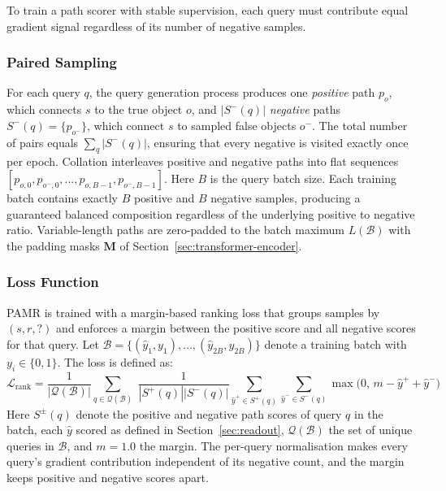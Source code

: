 \documentclass[runningheads]{llncs}
\begin{document}
\label{sec:training}

To train a path scorer with stable supervision, each query must contribute equal gradient
signal regardless of its number of negative samples.
\subsubsection{Paired Sampling}
\label{sec:paired-sampling}

For each query $q$, the query generation process produces one
\textit{positive} path $p_o$, which connects $s$ to the
true object $o$, and $|S^-(q)|$ \textit{negative} paths
$S^-(q) = \{p_{o^-}\}$, which connect
$s$ to sampled false objects $o^-$. The total number of pairs equals
$\sum_q |S^-(q)|$, ensuring that every negative is visited exactly
once per epoch. Collation interleaves positive and negative paths
into flat sequences
$[p_{o,0}, p_{o^-,0}, \ldots, p_{o,B-1}, p_{o^-,B-1}]$.
Here $B$ is the query batch size. Each training batch contains
exactly $B$ positive and $B$ negative samples, producing a guaranteed
balanced composition regardless of the underlying positive to negative
ratio. Variable-length paths are zero-padded to the batch maximum
$L(\mathcal{B})$ with the padding masks $\mathbf{M}$ of
Section~\ref{sec:transformer-encoder}.

\subsubsection{Loss Function}
\label{sec:loss-functions}

PAMR is trained with a margin-based ranking loss that groups samples
by $(s, r, ?)$ and enforces a margin between the positive score
and all negative scores for that query. Let $\mathcal{B} = \{(\hat{y}_1, y_1), \ldots, (\hat{y}_{2B}, y_{2B})\}$
denote a training batch with $y_i \in \{0, 1\}$. The loss is defined as:
\begin{equation}
  \mathcal{L}_{\text{rank}} = \frac{1}{|\mathcal{Q}(\mathcal{B})|} \sum_{q \in \mathcal{Q}(\mathcal{B})}\; \frac{1}{|S^+(q)||S^-(q)|} \sum_{\hat{y}^+ \in S^+(q)} \sum_{\hat{y}^- \in S^-(q)}
  \max\bigl(0,\, m - \hat{y}^+ + \hat{y}^-\bigr)
  \label{eq:loss-rank}
\end{equation}
Here $S^{\pm}(q)$ denote the positive and negative path scores of query
$q$ in the batch, each $\hat{y}$ scored as defined in
Section~\ref{sec:readout}, $\mathcal{Q}(\mathcal{B})$ the set of unique
queries in $\mathcal{B}$, and $m = 1.0$ the margin. The per-query
normalisation makes every query's gradient contribution independent of
its negative count, and the margin keeps positive and negative scores
apart.
\end{document}

